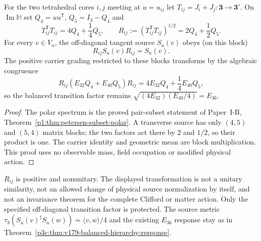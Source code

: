 \documentclass[12pt,a4paper]{article}
\begin{document}
\begin{theorem}
\label{p3c:thm:v319-petersen-midpoint}
For the two tetrahedral cores $i,j$ meeting at $u=u_{ij}$ let
$T_{ij}=J_i+J_j:\mathbf3\to\mathbf3'$.  On
$\operatorname{Im}\mathbb H$ set $Q_4=uu^{\mathsf T}$,
$Q_5=I_3-Q_4$ and
\[
  T_{ij}^{\mathsf T}T_{ij}=4Q_4+\frac14Q_5,\qquad
  R_{ij}:=(T_{ij}^{\mathsf T}T_{ij})^{1/2}
             =2Q_4+\frac12Q_5.
\]
For every $v\in V_u$, the off-diagonal tangent source
$S_u(v)$ obeys (on this block)
\[
 R_{ij} S_u(v)R_{ij}=S_u(v).
\]
The positive carrier grading restricted to these blocks transforms
by the algebraic congruence
\[
 R_{ij}(E_{32}Q_4+E_{40}Q_5)R_{ij}
      =4E_{32}Q_4+\frac14E_{40}Q_5,
\]
so the balanced transition factor remains
$\sqrt{(4E_{32})(E_{40}/4)}=E_{36}$.
\end{theorem}
\begin{proof}
The polar spectrum is the proved pair-subset statement of Paper~I-B,
Theorem~\ref{p1:thm:petersen-subset-polar}.  A transverse source
has only $(4,5)$ and $(5,4)$ matrix blocks; the two factors act
there by $2$ and $1/2$, so their product is one.  The carrier identity
and geometric mean are block multiplication.  This proof uses no
observable mass, field occupation or modified physical action.
\end{proof}

\begin{remark}
\label{p3c:rem:v319-not-a-gauge-change}
$R_{ij}$ is positive and nonunitary.  The displayed transformation is
not a unitary similarity, not an allowed change of physical source
normalization by itself, and not an invariance theorem for the complete
Clifford or matter action.  Only the specified off-diagonal transition
factor is protected.  The source metric
$\tau_8(S_u(v)^\dagger S_u(w))=\langle v,w\rangle/4$
and the existing $E_{36}$ response stay as in
Theorem~\ref{p3c:thm:v179-balanced-hierarchy-response}.
\end{remark}
\end{document}
